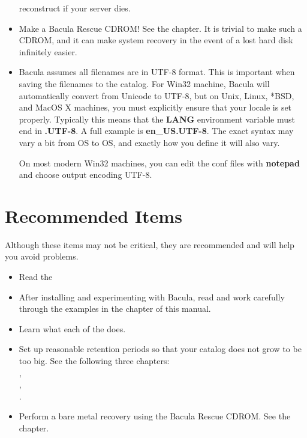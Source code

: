 \begin{itemize}
   reconstruct if your server dies.
\item Make a Bacula Rescue CDROM! See the 
    chapter. It is trivial to  make such a CDROM,
   and it can make system recovery in the event of  a lost hard disk infinitely
   easier. 
\item Bacula assumes all filenames are in UTF-8 format. This is important 
   when saving the filenames to the catalog. For Win32 machine, Bacula will
   automatically convert from Unicode to UTF-8, but on Unix, Linux, *BSD,
   and MacOS X machines, you must explicitly ensure that your locale is set
   properly. Typically this means that the {\bf LANG} environment variable
   must end in {\bf .UTF-8}. A full example is {\bf en\_US.UTF-8}. The
   exact syntax may vary a bit from OS to OS, and exactly how you define it
   will also vary.

   On most modern Win32 machines, you can edit the conf files with {\bf
   notepad} and choose output encoding UTF-8.
\end{itemize}

\section{Recommended Items}

Although these items may not be critical, they are recommended and will help
you avoid problems. 

\begin{itemize}
\item Read the  
\item After installing and experimenting with Bacula, read and work carefully 
   through the examples in the 
    chapter  of this manual. 
\item Learn what each of the  
   does. 
\item Set up reasonable retention periods so that your catalog does not  grow
   to be too big. See the following three chapters:\\
   ,\\
   ,\\
   . 
\item Perform a bare metal recovery using the Bacula Rescue CDROM.  See the 
    chapter. 
\end{itemize}

